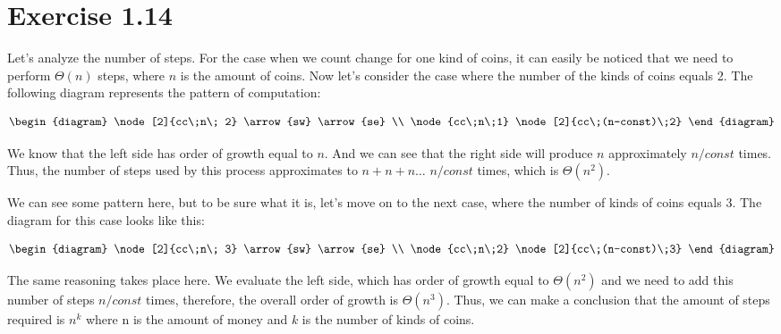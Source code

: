 \section*{Exercise 1.14}

Let's analyze the number of steps. For the case when we count change for one kind of coins, it can easily be noticed that we need to perform $\Theta(n)$ steps, where $n$ is the amount of coins. Now let's consider the case where the number of the kinds of coins equals 2. The following diagram represents the pattern of computation:

\[
	\begin{diagram}
		\node[2]{cc\;n\; 2} \arrow{sw}
		\arrow{se}
		\\
		\node{cc\;n\;1} \node[2]{cc\;(n-const)\;2}
	\end{diagram}
\]

We know that the left side has order of growth equal to $n$. And we can see that the right side will produce $n$ approximately $n/const$ times. Thus, the number of steps used by this process approximates to $n+n+n\dots$ $n/const$ times, which is $\Theta(n^2)$.

We can see some pattern here, but to be sure what it is, let's move on to the next case, where the number of kinds of coins equals $3$. The diagram for this case looks like this:

\[
	\begin{diagram}
		\node[2]{cc\;n\; 3} \arrow{sw}
		\arrow{se}
		\\
		\node{cc\;n\;2} \node[2]{cc\;(n-const)\;3}
	\end{diagram}
\]

The same reasoning takes place here. We evaluate the left side, which has order of growth equal to $\Theta(n^2)$ and we need to add this number of steps $n/const$ times, therefore, the overall order of growth is $\Theta(n^3)$. Thus, we can make a conclusion that the amount of steps required is $n^k$ where n is the amount of money and $k$ is the number of kinds of coins.
